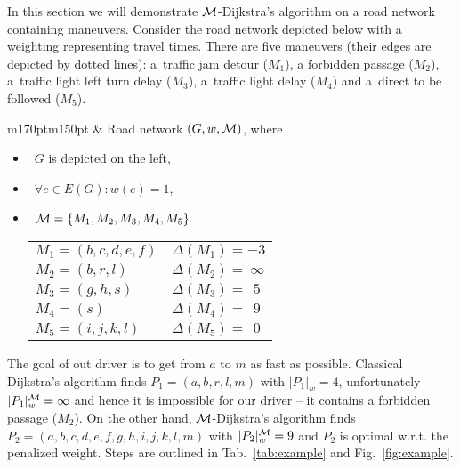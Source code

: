\documentclass[envcountsect,envcountsame]{llncs}
\begin{document}
In this section we will demonstrate $\cal{M}$-Dijkstra's algorithm on 
a road network containing maneuvers. Consider the road network depicted 
below with a weighting representing travel times. There are five 
maneuvers (their edges are depicted by dotted lines): a~traffic jam detour 
($M_1$), a forbidden passage ($M_2$), a~traffic light left turn delay 
($M_3$), a~traffic light delay ($M_4$) and a~direct to be followed ($M_5$). 

\medskip
\begin{tabular}{m{170pt}m{150pt}}
&
\hskip 5pt Road network $(G,w,{\cal{M}})$, where
\begin{itemize}
\item ~$G$ is depicted on the left,
\vskip 2pt
\item ~$\forall e \in E(G): w(e)=1$,
\vskip 2pt
\item ~${\cal{M}}=\{M_1,M_2,M_3,M_4,M_5\}$
\vskip 5pt
\begin{tabular}{l@{~}l}
$M_1 = (b,c,d,e,f)$ & $\Delta(M_1)=-3$ \\[3pt]
$M_2 = (b,r,l)$ & $\Delta(M_2)=~\infty$ \\[3pt]
$M_3 = (g,h,s)$ & $\Delta(M_3)=~~5$ \\[3pt]
$M_4 = (s)$ & $\Delta(M_4) = ~~9$ \\[3pt]
$M_5 = (i,j,k,l)$ & $\Delta(M_5)=~~0$
\end{tabular}
\end{itemize} 
\end{tabular}
\medskip

The goal of out driver is to get from $a$ to $m$ as fast as possible. Classical 
Dijkstra's algorithm finds \mbox{$P_1=(a,b,r,l,m)$} with $|P_1|_w = 4$, 
unfortunately $|P_1|_w^{\cal{M}} = \infty$ and hence it is impossible for our 
driver -- it contains a forbidden passage ($M_2$). On the other hand, 
$\cal{M}$-Dijkstra's algorithm finds $P_2=(a,b,c,d,e,f,g,h,i,j,k,l,m)$ with
$|P_2|_w^{\cal{M}} = 9$ and $P_2$ is optimal w.r.t. the penalized weight. 
Steps are outlined in Tab.~\ref{tab:example} and Fig.~\ref{fig:example}. 
\end{document}
